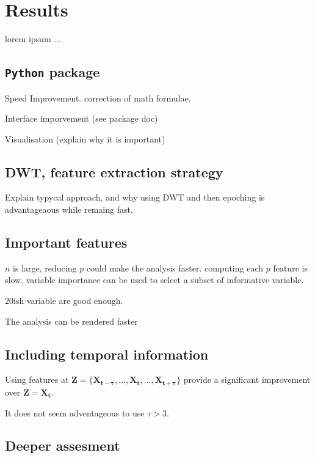 \section{Results} \label{results}

lorem ipsum ...
\subsection{\texttt{Python} package}
Speed Improvement. correction of math formulae.

Interface imporvement (see package doc)

Visualisation (explain why it is important)

\subsection{DWT, feature extraction strategy}
Explain typycal approach, and why using DWT and then epoching is advantageaous while remaing fast.

\subsection{Important features}
$n$ is large, reducing $p$ could make the analysis faster. computing each $p$ feature is slow.
variable importance can be used to select a subset of informative variable.

20ish variable are good enough.

The analysis can be rendered faster
\subsection{Including temporal information}
Using features at $\mathbf{Z} = \{\mathbf{X_{t-\tau}}, ..., \mathbf{X_{t}}, ..., \mathbf{X_{t+\tau}}\}$ provide a significant improvement over $\mathbf{Z} = \mathbf{X_{t}}$.

It does not seem adventageous to use $\tau > 3$.
\subsection{Deeper assesment}
